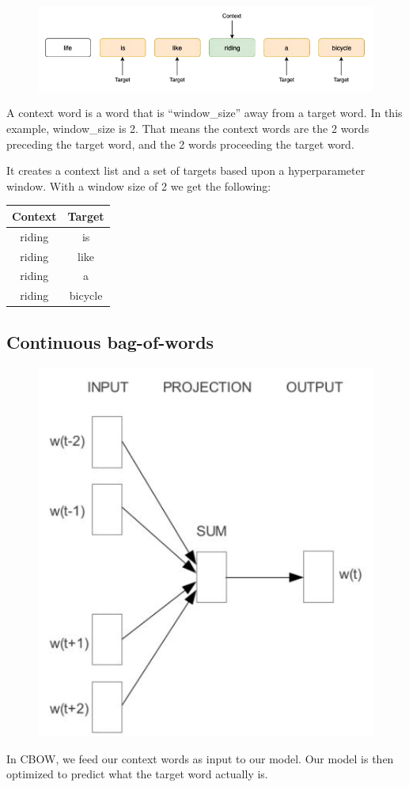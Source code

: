 \documentclass[11pt]{article}
\begin{document}
\begin{figure}[H]
    \centering
    \includegraphics[width=.6\linewidth]{figures/window.png}
\end{figure}

A context word is a word that is ``window\_size'' away from a target word. In this example, window\_size is 2. That means the context words are the 2 words preceding the target word, and the 2 words proceeding the target word.

It creates a context list and a set of targets based upon a hyperparameter window. With a window size of 2 we get the following:

\begin{table}[h]
    \centering
    \begin{tabular}{|c|c|}
        \hline
        \textbf{Context} & \textbf{Target} \\
        \hline
        riding & is \\ 
        riding & like \\
        riding & a \\ 
        riding & bicycle \\ 
        \hline
    \end{tabular}
\end{table}

\subsection{Continuous bag-of-words}

\begin{figure}[H]
    \centering
    \includegraphics[width=.3\linewidth]{figures/CBOW.png}
\end{figure}

In CBOW, we feed our context words as input to our model. Our model is then optimized to predict what the target word actually is.
\end{document}
